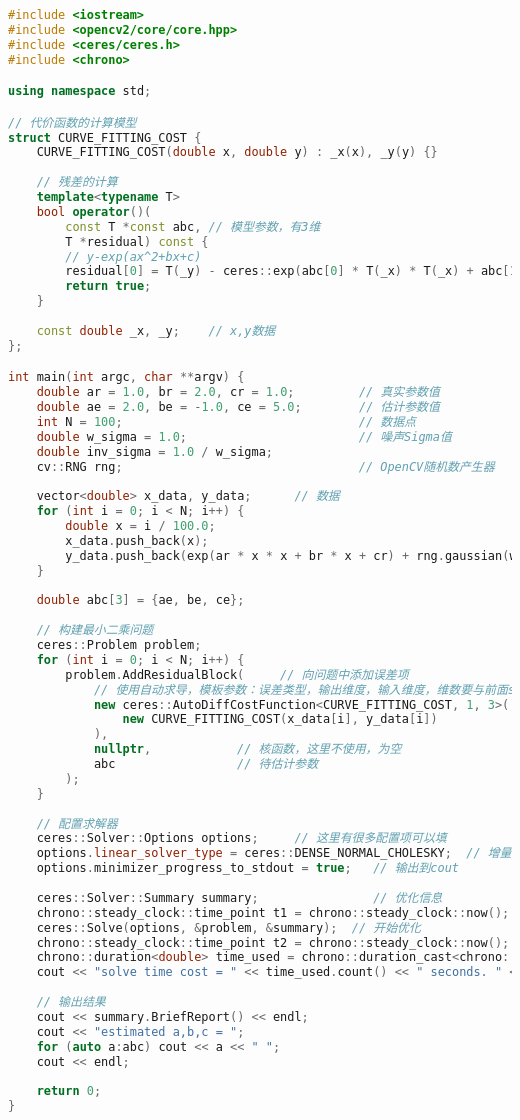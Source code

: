 \begin{lstlisting}[language=c++,caption=slambook/ch6/ceresCurveFitting.cpp]
#include <iostream>
#include <opencv2/core/core.hpp>
#include <ceres/ceres.h>
#include <chrono>

using namespace std;

// 代价函数的计算模型
struct CURVE_FITTING_COST {
    CURVE_FITTING_COST(double x, double y) : _x(x), _y(y) {}
    
    // 残差的计算
    template<typename T>
    bool operator()(
        const T *const abc, // 模型参数，有3维
        T *residual) const {
        // y-exp(ax^2+bx+c)
        residual[0] = T(_y) - ceres::exp(abc[0] * T(_x) * T(_x) + abc[1] * T(_x) + abc[2]);
        return true;
    }
    
    const double _x, _y;    // x,y数据
};

int main(int argc, char **argv) {
    double ar = 1.0, br = 2.0, cr = 1.0;         // 真实参数值
    double ae = 2.0, be = -1.0, ce = 5.0;        // 估计参数值
    int N = 100;                                 // 数据点
    double w_sigma = 1.0;                        // 噪声Sigma值
    double inv_sigma = 1.0 / w_sigma;
    cv::RNG rng;                                 // OpenCV随机数产生器
    
    vector<double> x_data, y_data;      // 数据
    for (int i = 0; i < N; i++) {
        double x = i / 100.0;
        x_data.push_back(x);
        y_data.push_back(exp(ar * x * x + br * x + cr) + rng.gaussian(w_sigma * w_sigma));
    }
    
    double abc[3] = {ae, be, ce};
    
    // 构建最小二乘问题
    ceres::Problem problem;
    for (int i = 0; i < N; i++) {
        problem.AddResidualBlock(     // 向问题中添加误差项
            // 使用自动求导，模板参数：误差类型，输出维度，输入维度，维数要与前面struct中一致
            new ceres::AutoDiffCostFunction<CURVE_FITTING_COST, 1, 3>(
                new CURVE_FITTING_COST(x_data[i], y_data[i])
            ),
            nullptr,            // 核函数，这里不使用，为空
            abc                 // 待估计参数
        );
    }
    
    // 配置求解器
    ceres::Solver::Options options;     // 这里有很多配置项可以填
    options.linear_solver_type = ceres::DENSE_NORMAL_CHOLESKY;  // 增量方程如何求解
    options.minimizer_progress_to_stdout = true;   // 输出到cout
    
    ceres::Solver::Summary summary;                // 优化信息
    chrono::steady_clock::time_point t1 = chrono::steady_clock::now();
    ceres::Solve(options, &problem, &summary);  // 开始优化
    chrono::steady_clock::time_point t2 = chrono::steady_clock::now();
    chrono::duration<double> time_used = chrono::duration_cast<chrono::duration<double>>(t2 - t1);
    cout << "solve time cost = " << time_used.count() << " seconds. " << endl;
    
    // 输出结果
    cout << summary.BriefReport() << endl;
    cout << "estimated a,b,c = ";
    for (auto a:abc) cout << a << " ";
    cout << endl;
    
    return 0;
}
\end{lstlisting}

